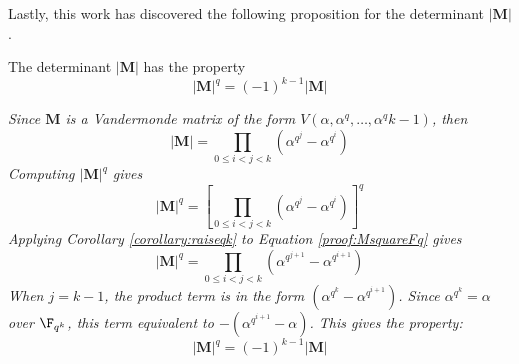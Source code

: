 Lastly, this work has discovered the following proposition for the determinant $|\mathbf{M}|$.
\begin{Proposition}
The determinant $|\mathbf{M}|$ has the property
\begin{equation}
|\mathbf{M}|^q=(-1)^{k-1}|\mathbf{M}|
\end{equation}
\end{Proposition}
\begin{Proof}
\it Since $\mathbf{M}$ is a Vandermonde matrix of the form $V(\alpha,\alpha^q,\dots,\alpha^q{k-1})$, 
then 
\begin{equation}
|\mathbf{M}| = \prod\limits_{0\leq i < j < k}(\alpha^{q^j}-\alpha^{q^i}) \label{proofeqn:detMFq}
\end{equation}
Computing $|\mathbf{M}|^q$ gives
\begin{equation} \label{proof:MsquareFq}
|\mathbf{M}|^q = [\prod\limits_{0\leq i < j < k}(\alpha^{q^j}-\alpha^{q^i})]^q
\end{equation}
Applying Corollary \ref{corollary:raiseqk} to Equation \ref{proof:MsquareFq} gives
\begin{equation}
|\mathbf{M}|^q = \prod\limits_{0\leq i < j < k}(\alpha^{q^{j+1}}-\alpha^{q^{i+1}})
\end{equation}
When $j=k-1$, the product term is in the form $(\alpha^{q^k}-\alpha^{q^{i+1}})$. 
Since $\alpha^{q^k}=\alpha$ over $\F_{q^k}$, this term equivalent to  $-(\alpha^{q^{i+1}}-\alpha)$.
This gives the property:
\begin{equation}
|\mathbf{M}|^q=(-1)^{k-1}|\mathbf{M}|
\end{equation}
\end{Proof}
